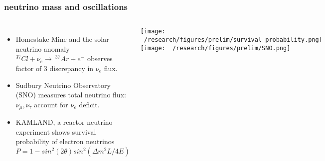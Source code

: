 \documentclass{beamer}
\begin{document}
	\begin{frame}
		\frametitle{neutrino mass and oscillations}
		\begin{columns}[c] %
			
			\begin{itemize}
				\setlength\itemsep{2em}
				\item Homestake Mine and the solar neutrino anomaly $^{37}Cl+\nu_e \rightarrow \ ^{37}Ar + e^-$ observes factor of 3 discrepancy in $\nu_e$ flux.
				\item Sudbury Neutrino Observatory (SNO) measures total neutrino flux: $\nu_{\mu}, \nu_{\tau}$ account for $\nu_e$ deficit.
				\item KAMLAND, a reactor neutrino experiment shows survival probability of electron neutrinos $P = 1 - sin^2 (2\theta)sin^2(\Delta m^2 L \slash 4E)$
				
			\end{itemize}
			
			\texttt{[image: ~/research/figures/prelim/survival\_probability.png]}
			\texttt{[image: ~/research/figures/prelim/SNO.png]}
			
		\end{columns}
	\end{frame}
	
\end{document}
